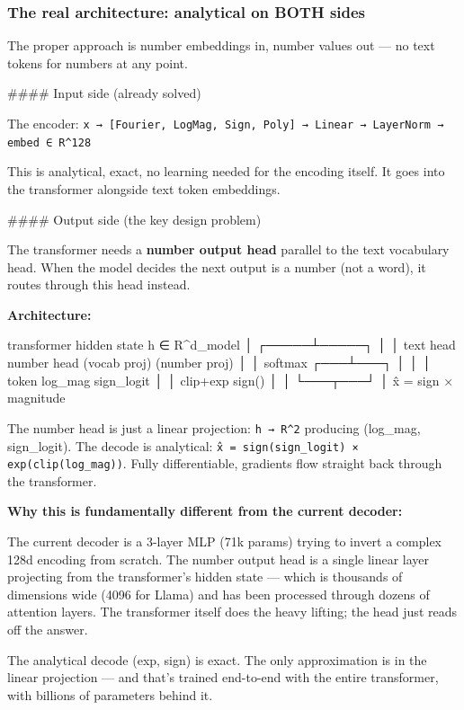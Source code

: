 \documentclass[11pt]{article}
\begin{document}
\subsubsection*{The real architecture: analytical on BOTH sides}


The proper approach is number embeddings in, number values out — no text tokens for numbers at any point.


\#\#\#\# Input side (already solved)


The encoder: \texttt{x → [Fourier, LogMag, Sign, Poly] → Linear → LayerNorm → embed ∈ R\textasciicircum{}128}


This is analytical, exact, no learning needed for the encoding itself. It goes into the transformer alongside text token embeddings.


\#\#\#\# Output side (the key design problem)


The transformer needs a \textbf{number output head} parallel to the text vocabulary head. When the model decides the next output is a number (not a word), it routes through this head instead.


\textbf{Architecture:}


\begin{CodeBlock}
transformer hidden state h ∈ R^d_model
          │
    ┌─────┴─────┐
    │            │
text head    number head
(vocab proj)  (number proj)
    │            │
 softmax     ┌───┴───┐
    │        │       │
 token    log_mag  sign_logit
          │       │
       clip+exp  sign()
          │       │
          └───┬───┘
              │
         x̂ = sign × magnitude
\end{CodeBlock}


The number head is just a linear projection: \texttt{h → R\textasciicircum{}2} producing (log\_mag, sign\_logit). The decode is analytical: \texttt{x̂ = sign(sign\_logit) × exp(clip(log\_mag))}. Fully differentiable, gradients flow straight back through the transformer.


\textbf{Why this is fundamentally different from the current decoder:}


The current decoder is a 3-layer MLP (71k params) trying to invert a complex 128d encoding from scratch. The number output head is a single linear layer projecting from the transformer's hidden state — which is thousands of dimensions wide (4096 for Llama) and has been processed through dozens of attention layers. The transformer itself does the heavy lifting; the head just reads off the answer.


The analytical decode (exp, sign) is exact. The only approximation is in the linear projection — and that's trained end-to-end with the entire transformer, with billions of parameters behind it.
\end{document}
